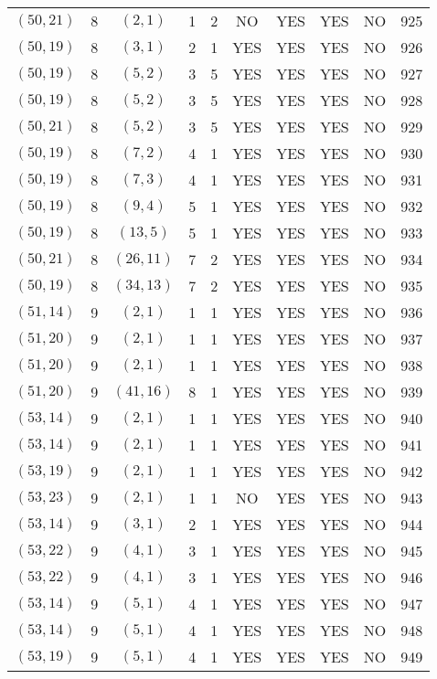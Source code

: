 \begin{longtable}{|c|c|c|c|c|c|c|c|c|c|}
$(50, 21)$ & 8 & $(2, 1)$ & 1 & 2 & NO & YES & YES & NO & 925\\
$(50, 19)$ & 8 & $(3, 1)$ & 2 & 1 & YES & YES & YES & NO & 926\\
$(50, 19)$ & 8 & $(5, 2)$ & 3 & 5 & YES & YES & YES & NO & 927\\
$(50, 19)$ & 8 & $(5, 2)$ & 3 & 5 & YES & YES & YES & NO & 928\\
$(50, 21)$ & 8 & $(5, 2)$ & 3 & 5 & YES & YES & YES & NO & 929\\
$(50, 19)$ & 8 & $(7, 2)$ & 4 & 1 & YES & YES & YES & NO & 930\\
$(50, 19)$ & 8 & $(7, 3)$ & 4 & 1 & YES & YES & YES & NO & 931\\
$(50, 19)$ & 8 & $(9, 4)$ & 5 & 1 & YES & YES & YES & NO & 932\\
$(50, 19)$ & 8 & $(13, 5)$ & 5 & 1 & YES & YES & YES & NO & 933\\
$(50, 21)$ & 8 & $(26, 11)$ & 7 & 2 & YES & YES & YES & NO & 934\\
$(50, 19)$ & 8 & $(34, 13)$ & 7 & 2 & YES & YES & YES & NO & 935\\
$(51, 14)$ & 9 & $(2, 1)$ & 1 & 1 & YES & YES & YES & NO & 936\\
$(51, 20)$ & 9 & $(2, 1)$ & 1 & 1 & YES & YES & YES & NO & 937\\
$(51, 20)$ & 9 & $(2, 1)$ & 1 & 1 & YES & YES & YES & NO & 938\\
$(51, 20)$ & 9 & $(41, 16)$ & 8 & 1 & YES & YES & YES & NO & 939\\
$(53, 14)$ & 9 & $(2, 1)$ & 1 & 1 & YES & YES & YES & NO & 940\\
$(53, 14)$ & 9 & $(2, 1)$ & 1 & 1 & YES & YES & YES & NO & 941\\
$(53, 19)$ & 9 & $(2, 1)$ & 1 & 1 & YES & YES & YES & NO & 942\\
$(53, 23)$ & 9 & $(2, 1)$ & 1 & 1 & NO & YES & YES & NO & 943\\
$(53, 14)$ & 9 & $(3, 1)$ & 2 & 1 & YES & YES & YES & NO & 944\\
$(53, 22)$ & 9 & $(4, 1)$ & 3 & 1 & YES & YES & YES & NO & 945\\
$(53, 22)$ & 9 & $(4, 1)$ & 3 & 1 & YES & YES & YES & NO & 946\\
$(53, 14)$ & 9 & $(5, 1)$ & 4 & 1 & YES & YES & YES & NO & 947\\
$(53, 14)$ & 9 & $(5, 1)$ & 4 & 1 & YES & YES & YES & NO & 948\\
$(53, 19)$ & 9 & $(5, 1)$ & 4 & 1 & YES & YES & YES & NO & 949\\

\end{longtable}
